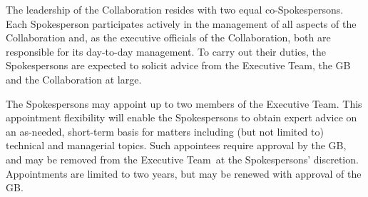 \documentclass[12pt]{article}
\newcommand{\exec}{{Executive Team}}
\begin{document}
The	%
leadership of the Collaboration resides with two equal co-Spokespersons.			
Each Spokesperson participates actively in the management of all aspects of the Collaboration and, as the executive officials of the Collaboration, both  are responsible for its day-to-day management. 
To carry out their duties, the Spokespersons are expected to solicit advice from the \exec, the GB and the Collaboration at large.  %

The Spokespersons may appoint up to two members of the \exec. This appointment flexibility will enable the Spokespersons to obtain expert advice on an as-needed, short-term basis for matters including (but not limited to) technical and managerial topics.
Such appointees require approval by the GB, 
and may be removed from the \exec\ at the Spokespersons' discretion.  Appointments are limited to two years, but may be renewed with approval of the GB. 
\end{document}
